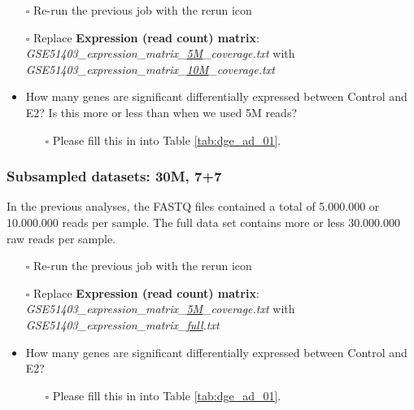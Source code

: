 \documentclass[11pt,a4paper]{article}
\begin{document}
\begin{itemize}
	\item [$\square$] Re-run the previous job with the rerun icon
	\item [$\square$] Replace \textbf{Expression (read count) matrix}: \textit{GSE51403\_expression\_matrix\_\underline{5M}\_coverage.txt} with \textit{GSE51403\_expression\_matrix\_\underline{10M}\_coverage.txt}
	\item How many genes are significant differentially expressed between Control and E2? Is this more or less than when we used 5M reads?
	\begin{itemize}
		\item[$\square$] Please fill this in into Table \ref{tab:dge_ad_01}.
	\end{itemize}
\end{itemize}
\subsubsection{Subsampled datasets: 30M, 7+7}
In the previous analyses, the FASTQ files contained a total of 5.000.000 or 10.000.000 reads per sample. The full data set contains more or less 30.000.000 raw reads per sample.
\begin{itemize}
	\item [$\square$] Re-run the previous job with the rerun icon
	\item [$\square$] Replace \textbf{Expression (read count) matrix}: \textit{GSE51403\_expression\_matrix\_\underline{5M}\_coverage.txt} with \textit{GSE51403\_expression\_matrix\_\underline{full}.txt}
	\item How many genes are significant differentially expressed between Control and E2?
	\begin{itemize}
		\item[$\square$] Please fill this in into Table \ref{tab:dge_ad_01}.
	\end{itemize}
\end{itemize}
\end{document}

